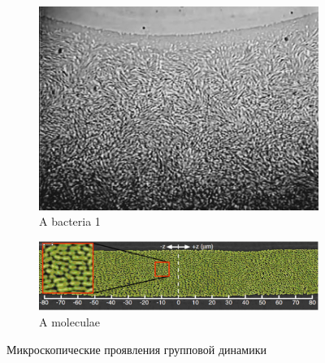    \begin{figure}
    	\centering
        \begin{subfigure}{0.3\textwidth}
                \includegraphics[width=\textwidth]{Fig11_CollectiveMotion}
                \caption{A bacteria 1}
                \label{fig:CollMot:bacteria}
        \end{subfigure}
        \begin{subfigure}{0.5\textwidth}
                \includegraphics[width=\textwidth]{Fig15_CollectiveMotion_part}
                \caption{A moleculae}
                \label{fig:CollMot:moleculae}
        \end{subfigure}
        \caption{Микроскопические проявления групповой динамики}
        \label{fig:CollMot:microscpoic}
    \end{figure}
